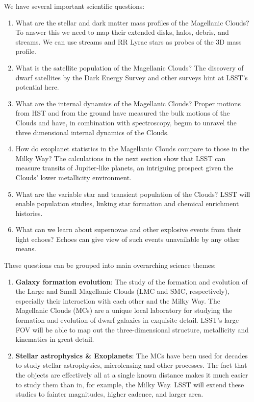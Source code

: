We have several important scientific questions:
\begin{enumerate}

\item What are the stellar and dark matter mass profiles of the
Magellanic Clouds?  To answer this we need to map their extended disks, halos, debris, and streams.  We can use
streams and RR Lyrae stars as probes of the 3D mass profile.

\item What is the satellite population of the Magellanic Clouds? The
discovery of dwarf satellites by the Dark Energy Survey and other
surveys hint at LSST's potential here.

\item What are the internal dynamics of the Magellanic Clouds?  Proper
motions from HST and from the ground have measured the bulk
motions of the Clouds and have, in combination with spectroscopy,
begun to unravel the three dimensional internal dynamics of the
Clouds.

\item How do exoplanet statistics in the Magellanic Clouds compare to
those in the Milky Way?  The calculations in the next section show that
LSST can measure transits of Jupiter-like planets, an intriguing
prospect given the Clouds' lower metallicity environment.

\item What are the variable star and transient population of the Clouds?
LSST will enable population studies, linking star formation and chemical
enrichment histories.

\item What can we learn about supernovae and other explosive events from
their light echoes?  Echoes can give view of such events unavailable by
any other means.

\end{enumerate}


These questions can be grouped into main overarching science themes:
\begin{enumerate}
\item {\bf Galaxy formation evolution}: The study of the formation and
evolution of the Large and Small Magellanic Clouds (LMC and SMC,
respectively), especially their interaction with each other and the
Milky Way. The Magellanic Clouds (MCs) are a unique local laboratory
for studying the formation and evolution of dwarf galaxies in
exquisite detail.  LSST's large FOV will be able to map out the
three-dimensional structure, metallicity and kinematics in great
detail.
\item {\bf Stellar astrophysics \& Exoplanets}:  The MCs have been
used for decades to study stellar astrophysics, microlensing and other
processes.  The fact that the objects are effectively all at a single
known distance makes it much easier to study them than in, for
example, the Milky Way.  LSST will extend these studies to fainter
magnitudes, higher cadence, and larger area.
\end{enumerate}

